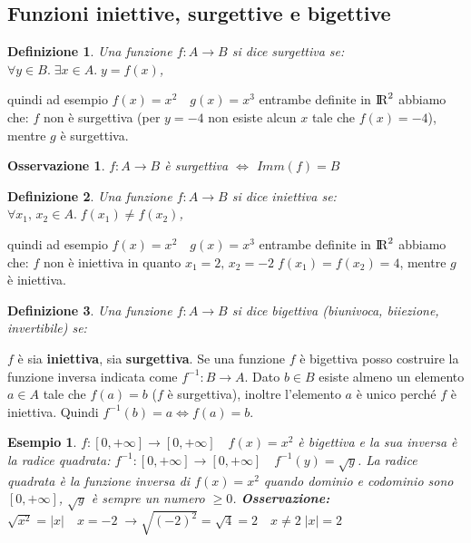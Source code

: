 \documentclass[12pt, a4paper]{article}
\theoremstyle{break}
\newtheorem{definition}{Definizione}[subsection]
\newtheorem{example}{Esempio}[subsection]
\newtheorem{observation}{Osservazione}[subsection]
\newcommand\R{{\rm I\!R}}
\begin{document}
    \subsection{Funzioni iniettive, surgettive e bigettive}
    \begin{definition}
        Una funzione $f: A\rightarrow B$ si dice surgettiva se: $\forall y\in B.\; \exists x\in A.\; y = f(x)$, 
    \end{definition}
    quindi ad esempio $f(x) = x^2\quad g(x) = x^3$ entrambe definite in $\R^2$ abbiamo che: $f$ non è surgettiva (per $y=-4$ non esiste alcun $x$ tale che $f(x) = -4$), mentre $g$ è surgettiva.
    \begin{observation}
        $f:A\rightarrow B$ è surgettiva $\Leftrightarrow$ $Imm(f) = B$
    \end{observation}
    \begin{definition}
        Una funzione $f:A\rightarrow B$ si dice iniettiva se: $\forall x_1,\,x_2\in A.\; f(x_1) \neq f(x_2)$,
    \end{definition}
    quindi ad esempio $f(x) = x^2\quad g(x) = x^3$ entrambe definite in $\R^2$ abbiamo che: $f$ non è iniettiva in quanto \newline$x_1 = 2,\, x_2 = -2\; f(x_1) = f(x_2) = 4$, mentre $g$ è iniettiva.
    \begin{definition}
        Una funzione $f: A\rightarrow B$ si dice bigettiva (biunivoca, biiezione, invertibile) se: 
    \end{definition}
    $f$ è sia \textbf{iniettiva}, sia \textbf{surgettiva}. Se una funzione $f$ è bigettiva posso costruire la funzione inversa indicata come $f^{-1}: B\rightarrow A$. Dato $b\in B$ esiste almeno un elemento $a\in A$ tale che $f(a) = b$ ($f$ è surgettiva), inoltre l'elemento $a$ è unico perché $f$ è iniettiva.\newline
    Quindi $f^{-1}(b) = a \Leftrightarrow f(a) = b$.
    \begin{example}
        $f:[0, +\infty]\rightarrow [0,+\infty]\quad f(x) = x^2$ è bigettiva e la sua inversa è la radice quadrata:\newline
        $f^{-1}:[0,+\infty]\rightarrow [0,+\infty]\quad f^{-1}(y) = \sqrt{y}$.\newline
        La radice quadrata è la funzione inversa di $f(x)  = x^2$ quando dominio e codominio sono $[0,+\infty]$,\newline
        $\sqrt{y}$ è sempre un numero $\geq 0$.\newline
        \textbf{Osservazione:} $\sqrt{x^2} = |x|\quad x=-2\;\rightarrow \sqrt{(-2)^2} = \sqrt{4} = 2\quad x\neq 2\; |x| = 2$    
    \end{example}
\end{document}
